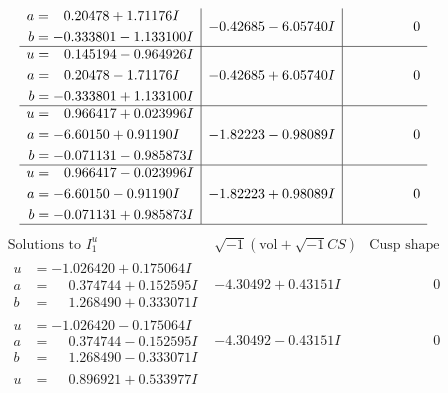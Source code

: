 \documentclass[1p]{elsarticle_modified}
\theoremstyle{definition}
\newcommand{\I}{\sqrt{-1}}
\begin{document}
$$\begin{array}{c|c|c}
\begin{aligned}
a &= \phantom{-}0.20478 + 1.71176 I \\
b &= -0.333801 - 1.133100 I\end{aligned}
 & -0.42685 - 6.05740 I & \phantom{-0.000000 } 0 \\ \hline\begin{aligned}
u &= \phantom{-}0.145194 - 0.964926 I \\
a &= \phantom{-}0.20478 - 1.71176 I \\
b &= -0.333801 + 1.133100 I\end{aligned}
 & -0.42685 + 6.05740 I & \phantom{-0.000000 } 0 \\ \hline\begin{aligned}
u &= \phantom{-}0.966417 + 0.023996 I \\
a &= -6.60150 + 0.91190 I \\
b &= -0.071131 - 0.985873 I\end{aligned}
 & -1.82223 - 0.98089 I & \phantom{-0.000000 } 0 \\ \hline\begin{aligned}
u &= \phantom{-}0.966417 - 0.023996 I \\
a &= -6.60150 - 0.91190 I \\
b &= -0.071131 + 0.985873 I\end{aligned}
 & -1.82223 + 0.98089 I & \phantom{-0.000000 } 0\\
 \hline 
 \end{array}$$\newpage$$\begin{array}{c|c|c}  
\text{Solutions to }I^u_{1}& \I (\text{vol} + \sqrt{-1}CS) & \text{Cusp shape}\\
 \hline 
\begin{aligned}
u &= -1.026420 + 0.175064 I \\
a &= \phantom{-}0.374744 + 0.152595 I \\
b &= \phantom{-}1.268490 + 0.333071 I\end{aligned}
 & -4.30492 + 0.43151 I & \phantom{-0.000000 } 0 \\ \hline\begin{aligned}
u &= -1.026420 - 0.175064 I \\
a &= \phantom{-}0.374744 - 0.152595 I \\
b &= \phantom{-}1.268490 - 0.333071 I\end{aligned}
 & -4.30492 - 0.43151 I & \phantom{-0.000000 } 0 \\ \hline\begin{aligned}
u &= \phantom{-}0.896921 + 0.533977 I \\

\end{aligned}
\end{array}$$
\end{document}
